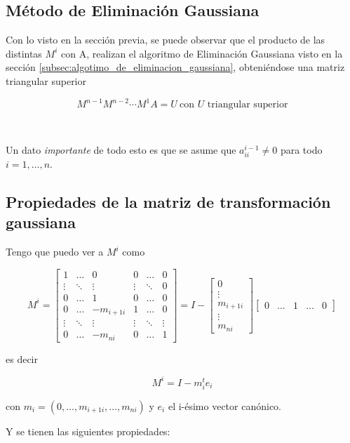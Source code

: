 \subsection{Método de Eliminación Gaussiana}
\label{subsec:metodo_de_eliminacion_gaussiana}

Con lo visto en la sección previa, se puede observar que el producto de las distintas $M^i$ con A, realizan el algoritmo de Eliminación Gaussiana visto en la sección \ref{subsec:algotimo_de_eliminacion_gaussiana}, obteniéndose una matriz triangular superior

\[
M^{n-1}M^{n-2}\cdots M^{1}A = U ~\text{con $U$ triangular superior}
\]

\

Un dato \emph{importante} de todo esto es que se asume que $a_{ii}^{i-1} \neq 0$ para todo $i = 1,\ldots,n$.

\subsection{Propiedades de la matriz de transformación gaussiana}

Tengo que puedo ver a $M^i$ como

\[
M^i =
\begin{bmatrix}
1 & \ldots & 0  & 0 & \ldots & 0 \\
\vdots & \ddots & \vdots & \vdots & \ddots & 0 \\
0  & \ldots & 1 & 0 & \ldots & 0 \\
0 & \ldots & -m_{i+1i} & 1 & \ldots & 0 \\
\vdots  & \ddots & \vdots & \vdots & \ddots & \vdots \\
0 & \ldots & -m_{ni} & 0 & \ldots & 1 
\end{bmatrix}
=
I -
\begin{bmatrix}
0 \\
\vdots \\
m_{i+1i} \\
\vdots \\
m_{ni}
\end{bmatrix}
\begin{bmatrix}
0 & \ldots & 1 & \ldots & 0
\end{bmatrix}
\]

es decir 

\[M^i = I - m_{i}^{t}e_i\]

con $m_i = (0, \ldots, m_{i+1i},\ldots,m_{ni})$ y $e_i$ el i-ésimo vector canónico.

\noindent Y se tienen las siguientes propiedades:

